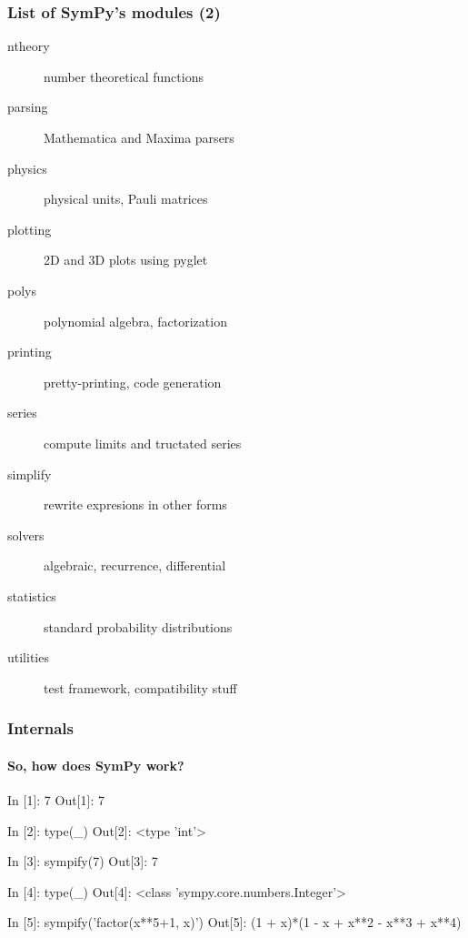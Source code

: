 \documentclass{beamer}
\begin{document}
\begin{frame}[fragile]
    \frametitle{List of SymPy's modules (2)}

    \begin{description}
        \item[ntheory] number theoretical functions
        \item[parsing] Mathematica and Maxima parsers
        \item[physics] physical units, Pauli matrices
        \item[plotting] 2D and 3D plots using pyglet
        \item[polys] polynomial algebra, factorization
        \item[printing] pretty-printing, code generation
        \item[series] compute limits and tructated series
        \item[simplify] rewrite expresions in other forms
        \item[solvers] algebraic, recurrence, differential
        \item[statistics] standard probability distributions
        \item[utilities] test framework, compatibility stuff
    \end{description}
\end{frame}

\begin{frame}[fragile]
    \frametitle{Internals}
    \framesubtitle{So, how does SymPy work?}

    \begin{python}
In [1]: 7
Out[1]: 7

In [2]: type(_)
Out[2]: <type 'int'>

In [3]: sympify(7)
Out[3]: 7

In [4]: type(_)
Out[4]: <class 'sympy.core.numbers.Integer'>

In [5]: sympify('factor(x**5+1, x)')
Out[5]: (1 + x)*(1 - x + x**2 - x**3 + x**4)
    \end{python}
\end{frame}
\end{document}
